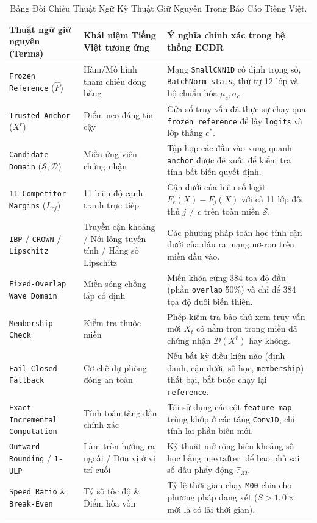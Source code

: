 \documentclass[11pt,a4paper]{article}
\newcommand{\F}{\mathbb{F}}
\newcommand{\code}[1]{{\small\ttfamily\nolinkurl{#1}}}
\newcommand{\Sset}{\mathcal{S}}
\newcommand{\Dset}{\mathcal{D}}
\theoremstyle{remark}
\begin{document}
\begin{table}[!htbp]
\centering\footnotesize
\caption{Bảng Đối Chiếu Thuật Ngữ Kỹ Thuật Giữ Nguyên Trong Báo Cáo Tiếng Việt.}
\label{tab:glossary}
\begin{tabularx}{\linewidth}{@{}P{4.2cm}P{4.3cm}Y@{}}
\toprule
\textbf{Thuật ngữ giữ nguyên (Terms)} & \textbf{Khái niệm Tiếng Việt tương ứng} & \textbf{Ý nghĩa chính xác trong hệ thống ECDR} \\
\midrule
\code{Frozen Reference} ($\widehat{F}$) & Hàm/Mô hình tham chiếu đóng băng & Mạng \code{SmallCNN1D} cố định trọng số, \code{BatchNorm stats}, thứ tự 12 lớp và bộ chuẩn hóa $\mu_c, \sigma_c$. \\
\code{Trusted Anchor} ($X^r$) & Điểm neo đáng tin cậy & Cửa sổ truy vấn đã thực sự chạy qua \code{frozen reference} để lấy \code{logits} và lớp thắng $c^*$. \\
\code{Candidate Domain} ($\Sset, \Dset$) & Miền ứng viên chứng nhận & Tập hợp các đầu vào xung quanh \code{anchor} được đề xuất để kiểm tra tính bất biến quyết định. \\
\code{11-Competitor Margins} ($L_{cj}$) & 11 biên độ cạnh tranh trực tiếp & Cận dưới của hiệu số logit $F_c(X) - F_j(X)$ với cả 11 lớp đối thủ $j \neq c$ trên toàn miền $\Sset$. \\
\code{IBP} / \code{CROWN} / \code{Lipschitz} & Truyền cận khoảng / Nới lỏng tuyến tính / Hằng số Lipschitz & Các phương pháp toán học tính cận dưới của đầu ra mạng nơ-ron trên miền đầu vào. \\
\code{Fixed-Overlap Wave Domain} & Miền sóng chồng lấp cố định & Miền khóa cứng 384 tọa độ đầu (phần \code{overlap} 50\%) và chỉ để 384 tọa độ đuôi biến thiên. \\
\code{Membership Check} & Kiểm tra thuộc miền & Phép kiểm tra bảo thủ xem truy vấn mới $X_t$ có nằm trọn trong miền đã chứng nhận $\Dset(X^r)$ hay không. \\
\code{Fail-Closed Fallback} & Cơ chế dự phòng đóng an toàn & Nếu bất kỳ điều kiện nào (định danh, cận dưới, số học, \code{membership}) thất bại, bắt buộc chạy lại \code{reference}. \\
\code{Exact Incremental Computation} & Tính toán tăng dần chính xác & Tái sử dụng các cột \code{feature map} trùng khớp ở các tầng \code{Conv1D}, chỉ tính lại phần biên mới. \\
\code{Outward Rounding} / \code{1-ULP} & Làm tròn hướng ra ngoài / Đơn vị ở vị trí cuối & Kỹ thuật mở rộng biên khoảng số học bằng $\operatorname{nextafter}$ để bao phủ sai số dấu phẩy động $\F_{32}$. \\
\code{Speed Ratio} \& \code{Break-Even} & Tỷ số tốc độ \& Điểm hòa vốn & Tỷ lệ thời gian chạy \code{M00} chia cho phương pháp đang xét ($S > 1,0\times$ mới là có lãi thời gian). \\
\bottomrule
\end{tabularx}
\end{table}
\end{document}
